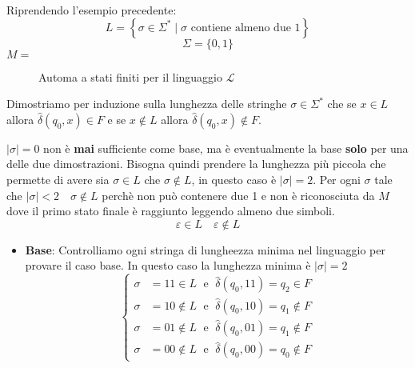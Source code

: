 \documentclass[a4paper]{article}
\begin{document}
\begin{example}
  Riprendendo l'esempio precedente:
  \[
    L = \left\{ \sigma \in \Sigma^* \;\left|\; \sigma \text{ contiene almeno due } 1 \right. \right\}
  \] 
  \[
    \Sigma = \{0,1\}
  \]
  \( M = \) 
  \begin{figure}[H]
    \centering
    \caption{Automa a stati finiti per il linguaggio \( \mathcal{L} \)}
  \end{figure}
  \noindent
  Dimostriamo per induzione sulla lunghezza delle stringhe \( \sigma \in \Sigma^* \) 
  che se \( x \in L \) allora \( \hat{\delta}(q_0, x) \in F \) e se \( x \notin L \) allora
  \( \hat{\delta}(q_0, x) \notin F \).

  \vspace{1em}
  \noindent
  \( \left| \sigma  \right| = 0 \) non è \textbf{mai} sufficiente come base, ma
  è eventualmente la base \textbf{solo} per una delle due dimostrazioni. Bisogna
  quindi prendere la lunghezza più piccola che permette di avere sia \( \sigma \in L \) 
  che  \( \sigma \notin L \), in questo caso è \( \left| \sigma  \right| = 2 \).
  Per ogni \( \sigma  \) tale che \( \left| \sigma  \right| < 2 \quad \sigma \notin L \)
  perchè non può contenere due 1 e non è riconosciuta da \( M \) dove il primo stato finale
  è raggiunto leggendo almeno due simboli.
  \[
    \varepsilon \in L \quad \varepsilon \notin L
  \] 
  \begin{itemize}
    \item \textbf{Base}: Controlliamo ogni stringa di lungheezza minima nel linguaggio per
      provare il caso base. In questo caso la lunghezza minima è
      \( \left| \sigma  \right| = 2 \) 
      \[
        \begin{cases}
          \sigma &= 11 \in L \; \text{ e } \; \hat{\delta}(q_0, 11) = q_2 \in F \\
          \sigma &= 10 \notin L \; \text{ e } \; \hat{\delta}(q_0, 10) = q_1 \notin F \\
          \sigma &= 01 \notin L \; \text{ e } \; \hat{\delta}(q_0, 01) = q_1 \notin F \\
          \sigma &= 00 \notin L \; \text{ e } \; \hat{\delta}(q_0, 00) = q_0 \notin F
        \end{cases}
      \] 


\end{itemize}
\end{example}
\end{document}
